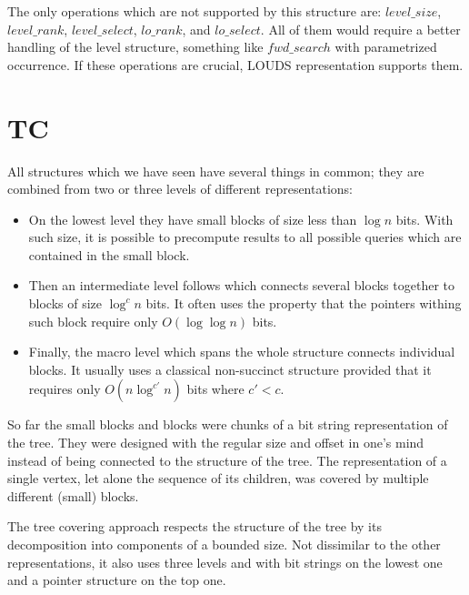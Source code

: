 \begin{algorithmic}
\texttt{}	\State {}
\EndFunction
\end{algorithmic}

\bigskip

The only operations which are not supported by this structure are: $level\_size$, $level\_rank$, $level\_select$, $lo\_rank$, and $lo\_select$.
All of them would require a better handling of the level structure, something like $fwd\_search$ with parametrized occurrence.
If these operations are crucial, LOUDS representation supports them.

\section{TC}

All structures which we have seen have several things in common; they are combined from two or three levels of different representations:
\begin{itemize}
	\item On the lowest level they have small blocks of size less than $\log n$ bits.
	With such size, it is possible to precompute results to all possible queries which are contained in the small block.
	\item Then an intermediate level follows which connects several blocks together to blocks of size $\log^c n$ bits.
	It often uses the property that the pointers withing such block require only $O(\log \log n)$ bits.
	\item Finally, the macro level which spans the whole structure connects individual blocks.
	It usually uses a classical non-succinct structure provided that it requires only $O(n \log^{c'} n)$ bits where $c' < c$.
\end{itemize}

So far the small blocks and blocks were chunks of a bit string representation of the tree.
They were designed with the regular size and offset in one's mind instead of being connected to the structure of the tree.
The representation of a single vertex, let alone the sequence of its children, was covered by multiple different (small) blocks.

The tree covering approach respects the structure of the tree by its decomposition into components of a bounded size.
Not dissimilar to the other representations, it also uses three levels and with bit strings on the lowest one and a pointer structure on the top one.

